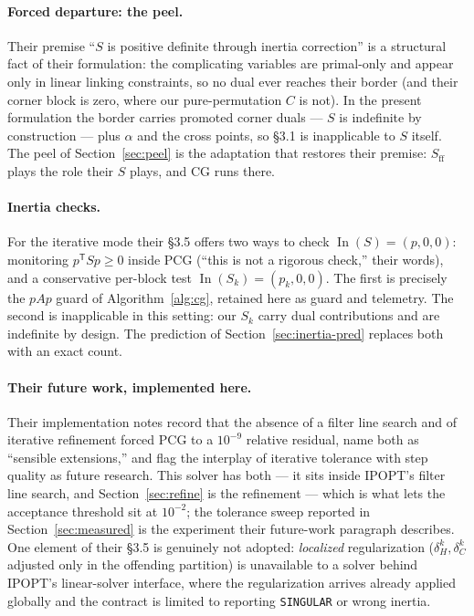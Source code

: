\documentclass[11pt]{article}
\newcommand{\In}{\operatorname{In}}
\newcommand{\code}[1]{\texttt{#1}}
\newcommand{\Sff}{S_{\mathrm{ff}}}
\begin{document}
\paragraph{Forced departure: the peel.}
Their premise ``$S$ is positive definite through inertia correction'' is a
structural fact of their formulation: the complicating variables are
primal-only and appear only in linear linking constraints, so no dual ever
reaches their border (and their corner block is zero, where our
pure-permutation $C$ is not).  In the present formulation the border carries
promoted corner duals --- $S$ is indefinite by construction --- plus $\alpha$
and the cross points, so \S 3.1 is inapplicable to $S$ itself.  The peel of
Section~\ref{sec:peel} is the adaptation that restores their premise:
$\Sff$ plays the role their $S$ plays, and CG runs there.

\paragraph{Inertia checks.}
For the iterative mode their \S 3.5 offers two ways to check
$\In(S) = (p,0,0)$: monitoring $p^{\mathsf T} S p \ge 0$ inside PCG (``this
is not a rigorous check,'' their words), and a conservative per-block test
$\In(S_k) = (p_k, 0, 0)$.  The first is precisely the $pAp$ guard of
Algorithm~\ref{alg:cg}, retained here as guard and telemetry.  The second is
inapplicable in this setting: our $S_k$ carry dual contributions and are
indefinite by design.  The prediction of Section~\ref{sec:inertia-pred}
replaces both with an exact count.

\paragraph{Their future work, implemented here.}
Their implementation notes record that the absence of a filter line search
and of iterative refinement forced PCG to a $10^{-9}$ relative residual, name
both as ``sensible extensions,'' and flag the interplay of iterative
tolerance with step quality as future research.  This solver has both --- it
sits inside IPOPT's filter line search, and Section~\ref{sec:refine} is the
refinement --- which is what lets the acceptance threshold sit at $10^{-2}$;
the tolerance sweep reported in Section~\ref{sec:measured} is the experiment
their future-work paragraph describes.  One element of their \S 3.5 is
genuinely not adopted: \emph{localized} regularization
($\delta^k_H, \delta^k_C$ adjusted only in the offending partition) is
unavailable to a solver behind IPOPT's linear-solver interface, where the
regularization arrives already applied globally and the contract is limited
to reporting \code{SINGULAR} or wrong inertia.
\end{document}
